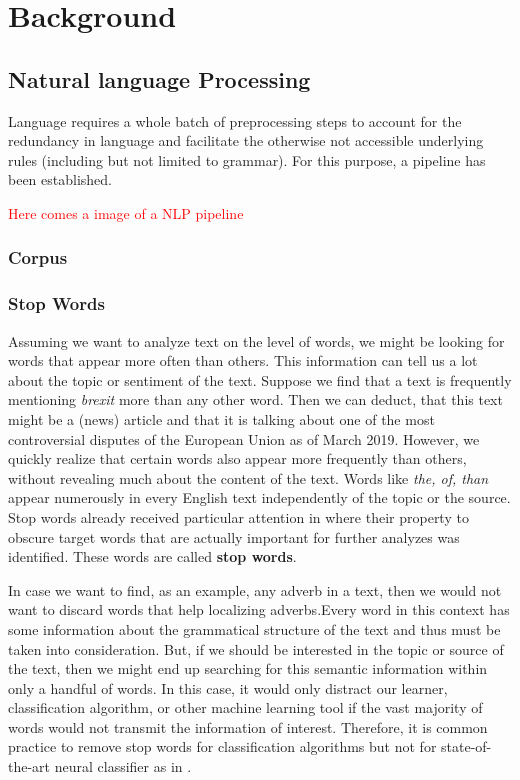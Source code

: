 \chapter{Background}


\section{Natural language Processing}
Language requires a whole batch of preprocessing steps to account for the redundancy in language and facilitate the otherwise not accessible underlying rules (including but not limited to grammar). For this purpose, a pipeline has been established.

\textcolor{red}{Here comes a image of a NLP pipeline}


\subsection{Corpus}

\subsection{Stop Words}
Assuming we want to analyze text on the level of words, we might be looking for
words that appear more often than others. This information can tell us a lot about the topic or sentiment of the text. Suppose we find that a text is frequently mentioning \textit{brexit} more than any other word. Then we can deduct, that this text might be a (news) article and that it is talking about one of the most controversial disputes of the European Union as of March 2019. However, we quickly realize that certain words also appear more frequently than others, without revealing much about the content of the text. Words like \textit{the, of, than} appear numerously in every English text independently of the topic or the source. Stop words already received particular attention in \citeyear{Luhn1960} where their property to obscure target words that are actually important for further analyzes was identified. These words are called \textbf{stop words}.

In case we want to find, as an example, any adverb in a text, then we would not want to discard words that help localizing adverbs.Every word in this context has some information about the grammatical structure of the text and thus must be taken into consideration. But, if we should be interested in the topic or source of the text, then we might end up searching for this semantic information within only a handful of words. In this case, it would only distract our learner, classification algorithm, or other machine learning tool if the vast majority of words would not transmit the information of interest. Therefore, it is common practice to remove stop words for classification algorithms \citep{McCallum1998, Lodhi2002, Tong2001} but not for state-of-the-art neural classifier as in \citep{Howard2018}.

